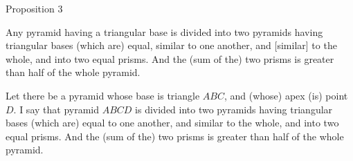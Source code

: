 
\begin{center}
{\large Proposition 3}
\end{center}

Any pyramid having a triangular base is divided into two
pyramids having triangular bases (which are) equal, similar to one another, and [similar] to the whole, and into two equal prisms. And the (sum of the) two prisms is greater than half of the
whole pyramid.

\epsfysize=2.2in
\centerline{}

Let there be a pyramid whose base is triangle $ABC$, and (whose) apex (is) point $D$. I say that
pyramid $ABCD$ is divided into two pyramids having triangular bases (which are) equal
to one another, and similar to the whole, and into two equal prisms. And the (sum of the)
two prisms is greater than half of the whole pyramid.

